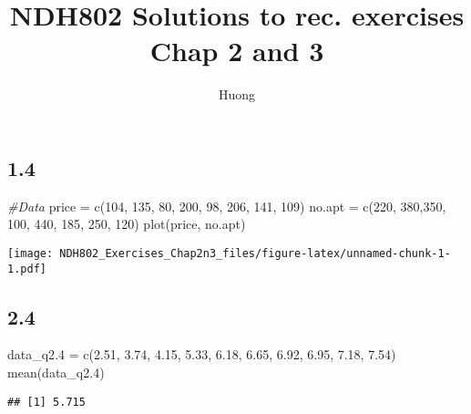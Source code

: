 \documentclass[
]{article}
\title{NDH802 Solutions to rec. exercises Chap 2 and 3}
\author{Huong}
\date{}
\newenvironment{Shaded}{\begin{snugshade}}{\end{snugshade}}
\newcommand{\CommentTok}[1]{\textcolor[rgb]{0.56,0.35,0.01}{\textit{#1}}}
\newcommand{\DecValTok}[1]{\textcolor[rgb]{0.00,0.00,0.81}{#1}}
\newcommand{\FloatTok}[1]{\textcolor[rgb]{0.00,0.00,0.81}{#1}}
\newcommand{\FunctionTok}[1]{\textcolor[rgb]{0.00,0.00,0.00}{#1}}
\newcommand{\NormalTok}[1]{#1}
\newcommand{\OtherTok}[1]{\textcolor[rgb]{0.56,0.35,0.01}{#1}}
\begin{document}
\maketitle

\hypertarget{section}{%
\subsection{1.4}\label{section}}

\begin{Shaded}
\begin{Highlighting}[]
\CommentTok{\#Data}
\NormalTok{price }\OtherTok{=} \FunctionTok{c}\NormalTok{(}\DecValTok{104}\NormalTok{, }\DecValTok{135}\NormalTok{, }\DecValTok{80}\NormalTok{, }\DecValTok{200}\NormalTok{, }\DecValTok{98}\NormalTok{, }\DecValTok{206}\NormalTok{, }\DecValTok{141}\NormalTok{, }\DecValTok{109}\NormalTok{)}
\NormalTok{no.apt }\OtherTok{=} \FunctionTok{c}\NormalTok{(}\DecValTok{220}\NormalTok{, }\DecValTok{380}\NormalTok{,}\DecValTok{350}\NormalTok{, }\DecValTok{100}\NormalTok{, }\DecValTok{440}\NormalTok{, }\DecValTok{185}\NormalTok{, }\DecValTok{250}\NormalTok{, }\DecValTok{120}\NormalTok{)}
\FunctionTok{plot}\NormalTok{(price, no.apt)}
\end{Highlighting}
\end{Shaded}

\texttt{[image: NDH802\_Exercises\_Chap2n3\_files/figure-latex/unnamed-chunk-1-1.pdf]}

\hypertarget{section-1}{%
\subsection{2.4}\label{section-1}}

\begin{Shaded}
\begin{Highlighting}[]
\NormalTok{data\_q2}\FloatTok{.4} \OtherTok{=} \FunctionTok{c}\NormalTok{(}\FloatTok{2.51}\NormalTok{, }\FloatTok{3.74}\NormalTok{, }\FloatTok{4.15}\NormalTok{, }\FloatTok{5.33}\NormalTok{, }\FloatTok{6.18}\NormalTok{, }\FloatTok{6.65}\NormalTok{, }\FloatTok{6.92}\NormalTok{, }\FloatTok{6.95}\NormalTok{, }\FloatTok{7.18}\NormalTok{, }\FloatTok{7.54}\NormalTok{)}
\FunctionTok{mean}\NormalTok{(data\_q2}\FloatTok{.4}\NormalTok{)}
\end{Highlighting}
\end{Shaded}

\begin{verbatim}
## [1] 5.715
\end{verbatim}
\end{document}
